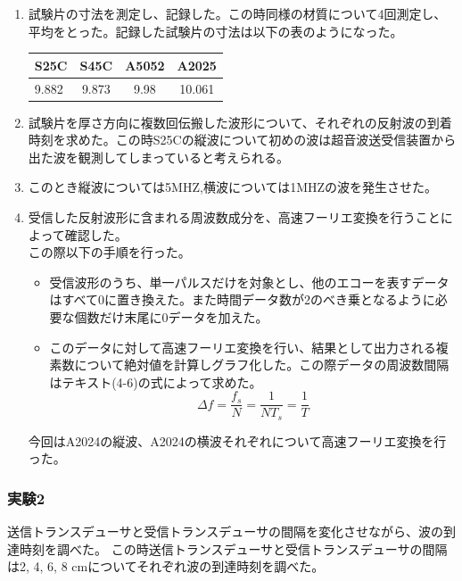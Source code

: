 \documentclass[uplatex,dvipdfmx,titlepage]{jsarticle}
\begin{document}
\begin{enumerate}[label=\arabic*.]
    \item 試験片の寸法を測定し、記録した。この時同様の材質について4回測定し、平均をとった。記録した試験片の寸法は以下の表のようになった。
    \begin{table}[H]
        \centering
        \begin{tabular}{lccc}
        \hline
        S25C & S45C & A5052 & A2025 \\ \hline
        9.882 & 9.873 & 9.98 & 10.061 \\ \hline
        \end{tabular}
    \end{table}

    \item 試験片を厚さ方向に複数回伝搬した波形について、それぞれの反射波の到着時刻を求めた。この時S25Cの縦波について初めの波は超音波送受信装置から出た波を観測してしまっていると考えられる。
    \item このとき縦波については5MHZ,横波については1MHZの波を発生させた。
    \item 受信した反射波形に含まれる周波数成分を、高速フーリエ変換を行うことによって確認した。\\
    この際以下の手順を行った。
    \begin{itemize}
        \item 受信波形のうち、単一パルスだけを対象とし、他のエコーを表すデータはすべて0に置き換えた。また時間データ数が2のべき乗となるように必要な個数だけ末尾に0データを加えた。
        \item このデータに対して高速フーリエ変換を行い、結果として出力される複素数について絶対値を計算しグラフ化した。この際データの周波数間隔はテキスト(4-6)の式によって求めた。
        \begin{equation}
        \Delta f = \frac{f_s}{N} = \frac{1}{NT_s} = \frac{1}{T}
        \end{equation}
    \end{itemize}
    今回はA2024の縦波、A2024の横波それぞれについて高速フーリエ変換を行った。
\end{enumerate}

\subsubsection*{実験2}
送信トランスデューサと受信トランスデューサの間隔を変化させながら、波の到達時刻を調べた。
この時送信トランスデューサと受信トランスデューサの間隔は2, 4, 6, 8 cmについてそれぞれ波の到達時刻を調べた。
\end{document}
